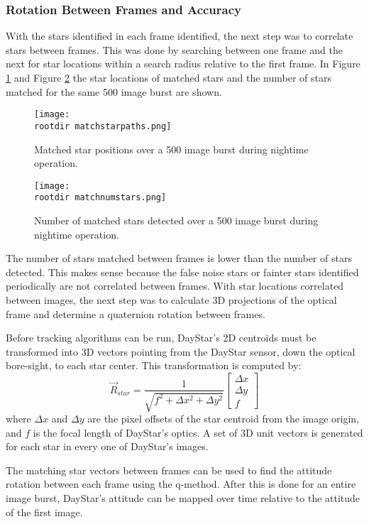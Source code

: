 \documentclass[twocolumn,letterpaper]{IEEEAerospace2012}
\newcommand{\brackets} [1] {\left[ #1 \right]}
\newcommand{\rootdir}{./Figures/}
\newcommand{\arrayb}[2]{\brackets{ \begin{array}{#1}  #2 \end{array} } }
\begin{document}
\subsubsection{Rotation Between Frames and Accuracy}

With the stars identified in each frame identified, the next step was to correlate stars between frames. This was done by searching between one frame and the next for star locations within a search radius relative to the first frame. In Figure \ref{fig:matchstarpaths} and Figure \ref{fig:matchnumstars} the star locations of matched stars and the number of stars matched for the same 500 image burst are shown.  
\begin{figure}
    \centering
    \texttt{[image: \\rootdir matchstarpaths.png]}
    \caption{Matched star positions over a 500 image burst during nightime operation.}
    \label{fig:matchstarpaths}
\end{figure}
\begin{figure}
    \centering
    \texttt{[image: \\rootdir matchnumstars.png]}
    \caption{Number of matched stars detected over a 500 image burst during nightime operation.}
    \label{fig:matchnumstars}
\end{figure}

The number of stars matched between frames is lower than the number of stars detected. This makes sense because the false noise stars or fainter stars identified periodically are not correlated between frames. With star locations correlated between images, the next step was to calculate 3D projections of the optical frame and determine a quaternion rotation between frames.   

Before tracking algorithms can be run, DayStar's 2D centroids must be transformed into 3D vectors pointing from the DayStar sensor, down the optical bore-sight, to each star center. This transformation is computed by:
\begin{equation}
    \vec{R}_{star} = \frac{1}{\sqrt{f^2 + \Delta{x^2} + \Delta{y^2}}} \arrayb{c}{\Delta{x} \\ \Delta{y} \\ f}
\end{equation}
where $\Delta{x}$ and $\Delta{y}$ are the pixel offsets of the star centroid from the image origin, and $f$ is the focal length of DayStar's optics. A set of 3D unit vectors is generated for each star in every one of DayStar's images.

The matching star vectors between frames can be used to find the attitude rotation between each frame using the q-method. After this is done for an entire image burst, DayStar's attitude can be mapped over time relative to the attitude of the first image.
\end{document}
